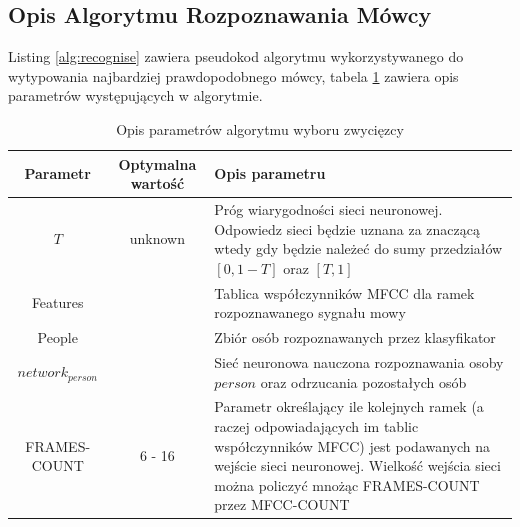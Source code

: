 \documentclass[a4paper]{article}
\begin{document}
	
	\subsection{Opis Algorytmu Rozpoznawania Mówcy}
	
		Listing \ref{alg:recognise} zawiera pseudokod algorytmu wykorzystywanego 
		do wytypowania najbardziej prawdopodobnego mówcy, tabela \ref{tab:srparams}
		zawiera opis parametrów występujących w algorytmie.
		\begin{table}[h]
			\centering
			\begin{tabular}{|c|c|p{6cm}|}
				\hline
				Parametr & Optymalna wartość & Opis parametru \\
				\hline \hline
				$T$ & unknown & Próg wiarygodności sieci neuronowej. Odpowiedz sieci będzie
				uznana za znaczącą wtedy gdy będzie należeć do sumy przedziałów $[0, 1-T]$ oraz
				$[T, 1]$ \\
				\hline
				Features & & Tablica współczynników MFCC dla ramek rozpoznawanego sygnału mowy \\
				\hline
				People & & Zbiór osób rozpoznawanych przez klasyfikator \\
				\hline
				$network_{person}$ & & Sieć neuronowa nauczona rozpoznawania osoby $person$ oraz 
				odrzucania pozostałych osób \\
				\hline
				FRAMES-COUNT & 6 - 16 & Parametr określający ile kolejnych ramek 
				(a raczej odpowiadających im tablic
				współczynników MFCC) jest podawanych na wejście sieci neuronowej. Wielkość wejścia sieci
				można policzyć mnożąc FRAMES-COUNT przez MFCC-COUNT \\
				\hline
			\end{tabular}			
			\caption{Opis parametrów algorytmu wyboru zwycięzcy}
			\label{tab:srparams}
		\end{table}		
\end{document}
